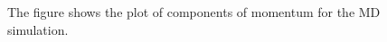 \documentclass{article}
\begin{document}
\begin{figure}[H]
\begin{centering}
\caption{The figure shows the plot of components of momentum for the MD simulation.}
\label{fig:fig1}
\end{centering}
\end{figure}
\end{document}
